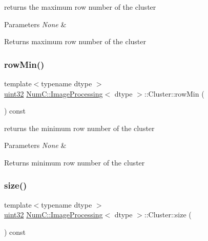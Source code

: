 returns the maximum row number of the cluster


\begin{DoxyParams}{Parameters}
{\em None} & \\
\hline
\end{DoxyParams}
\begin{DoxyReturn}{Returns}
maximum row number of the cluster 
\end{DoxyReturn}
\mbox{\label{class_num_c_1_1_image_processing_1_1_cluster_a87ebe359c4ad0e5996d1f8fef7e572fa}} 
\subsubsection{\texorpdfstring{row\+Min()}{rowMin()}}
{\footnotesize\ttfamily template$<$typename dtype $>$ \\
\mbox{\hyperlink{namespace_num_c_ae685802ca6d3035f2b400b081e3953fa}{uint32}} \mbox{\hyperlink{class_num_c_1_1_image_processing}{Num\+C\+::\+Image\+Processing}}$<$ dtype $>$\+::Cluster\+::row\+Min (\begin{DoxyParamCaption}{ }\end{DoxyParamCaption}) const\hspace{0.3cm}{\ttfamily [inline]}}

returns the minimum row number of the cluster


\begin{DoxyParams}{Parameters}
{\em None} & \\
\hline
\end{DoxyParams}
\begin{DoxyReturn}{Returns}
minimum row number of the cluster 
\end{DoxyReturn}
\mbox{\label{class_num_c_1_1_image_processing_1_1_cluster_a73749e4a4ae85d433c67affef75f019b}} 
\subsubsection{\texorpdfstring{size()}{size()}}
{\footnotesize\ttfamily template$<$typename dtype $>$ \\
\mbox{\hyperlink{namespace_num_c_ae685802ca6d3035f2b400b081e3953fa}{uint32}} \mbox{\hyperlink{class_num_c_1_1_image_processing}{Num\+C\+::\+Image\+Processing}}$<$ dtype $>$\+::Cluster\+::size (\begin{DoxyParamCaption}{ }\end{DoxyParamCaption}) const\hspace{0.3cm}{\ttfamily [inline]}}

